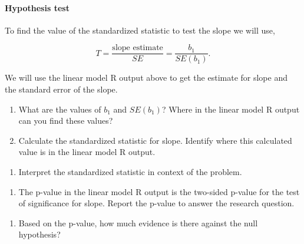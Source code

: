 \documentclass[
]{report}
\providecommand{\tightlist}{%
  \setlength{\itemsep}{0pt}\setlength{\parskip}{0pt}}
\begin{document}
\hypertarget{hypothesis-test-3}{%
\paragraph*{Hypothesis test}\label{hypothesis-test-3}}

To find the value of the standardized statistic to test the slope we will use,

\[
T = \frac{\mbox{slope estimate}}{SE} = \frac{b_1}{SE(b_1)}.
\]

We will use the linear model R output above to get the estimate for slope and the standard error of the slope.

\begin{enumerate}
\def\labelenumi{\arabic{enumi}.}
\setcounter{enumi}{6}
\item
  What are the values of \(b_1\) and \(SE(b_1)\)? Where in the linear model R output can you find these values?
  \vspace{0.5in}
\item
  Calculate the standardized statistic for slope. Identify where this calculated value is in the linear model R output.
\end{enumerate}

\newpage

\begin{enumerate}
\def\labelenumi{\arabic{enumi}.}
\setcounter{enumi}{8}
\tightlist
\item
  Interpret the standardized statistic in context of the problem.
\end{enumerate}

\vspace{0.8in}

\begin{enumerate}
\def\labelenumi{\arabic{enumi}.}
\setcounter{enumi}{9}
\tightlist
\item
  The p-value in the linear model R output is the two-sided p-value for the test of significance for slope. Report the p-value to answer the research question.
\end{enumerate}

\vspace{0.5in}

\begin{enumerate}
\def\labelenumi{\arabic{enumi}.}
\setcounter{enumi}{10}
\tightlist
\item
  Based on the p-value, how much evidence is there against the null hypothesis?
\end{enumerate}
\end{document}
